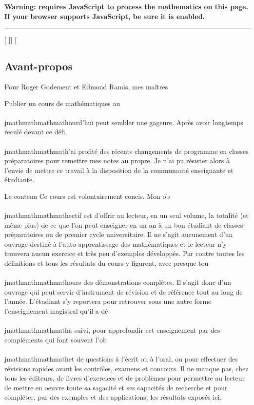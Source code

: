 \textbf{Warning: 
requires JavaScript to process the mathematics on this page.\\ If your
browser supports JavaScript, be sure it is enabled.}

\begin{center}\rule{3in}{0.4pt}\end{center}

{[}
{[}{]}
{[}

\subsection{Avant-propos}

Pour Roger Godement et Edmond Ramis, mes maîtres

Publier un cours de mathématiques au\\\\jmathmathmathmathourd'hui peut sembler une gageure.
Après avoir longtemps reculé devant ce défi, \\\\jmathmathmathmath'ai profité des récents
changements de programme en classes préparatoires pour remettre mes
notes au propre. Je n'ai pu résister alors à l'envie de mettre ce
travail à la disposition de la communauté enseignante et étudiante.

Le contenu Ce cours est volontairement concis. Mon ob\\\\jmathmathmathmathectif est d'offrir
au lecteur, en un seul volume, la totalité (et même plus) de ce que l'on
peut enseigner en un an à un bon étudiant de classes préparatoires ou de
premier cycle universitaire. Il ne s'agit aucunement d'un ouvrage
destiné à l'auto-apprentissage des mathématiques et le lecteur n'y
trouvera aucun exercice et très peu d'exemples développés. Par contre
toutes les définitions et tous les résultats du cours y figurent, avec
presque tou\\\\jmathmathmathmathours des démonstrations complètes. Il s'agit donc d'un
ouvrage qui peut servir d'instrument de révision et de référence tout au
long de l'année. L'étudiant s'y reportera pour retrouver sous une autre
forme l'enseignement magistral qu'il a dé\\\\jmathmathmathmathà suivi, pour approfondir cet
enseignement par des compléments qui font souvent l'ob\\\\jmathmathmathmathet de questions à
l'écrit ou à l'oral, ou pour effectuer des révisions rapides avant les
contrôles, examens et concours. Il ne manque pas, chez tous les
éditeurs, de livres d'exercices et de problèmes pour permettre au
lecteur de mettre en oeuvre toute sa sagacité et ses capacités de
recherche et pour compléter, par des exemples et des applications, les
résultats exposés ici.

